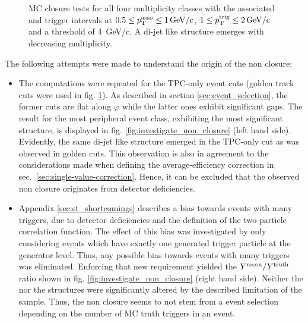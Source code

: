 \begin{figure}
\begin{subfigure}[b]{0.5\textwidth}
  \end{subfigure}
  \caption[MC closure tests for all four multiplicity classes.]{MC closure tests for all four multiplicity classes with the associated and trigger intervals at $0.5 \le p_{\text{T}}^{\text{asso}} \le \SI{1}{GeV/c}$, $1 \le p_{\text{T}}^{\text{trig}} \le \SI{2}{GeV/c}$ and a threshold of \SI{4}{GeV/c}. A di-jet like structure emerges with decreasing multiplicity.}
  \label{fig:closure_structure_w_threshold}
\end{figure}

The following attempts were made to understand the origin of the non closure:

\begin{itemize}
 \item The computations were repeated for the \gls{TPC-only} event cuts (\gls{golden} track cuts were used in fig. \ref{fig:closure_structure_w_threshold}). As described in section \ref{sec:event_selection}, the former cuts are flat along $\varphi$ while the latter ones exhibit significant gaps. The result for the most peripheral event class, exhibiting the most significant structure, is displayed in fig. \ref{fig:investigate_non_closure} (left hand side). Evidently, the same \gls{di-jet} like structure emerged in the \gls{TPC-only} cut as was observed in \gls{golden} cuts. This observation is also in agreement to the considerations made when defining the average-efficiency correction in sec.~\ref{sec:single-value-correction}. Hence, it can be excluded that the observed non closure originates from detector deficiencies.
 \item Appendix \ref{sec:st_shortcomings} describes a bias towards events with many triggers, due to detector deficiencies and the definition of the two-particle correlation function. The effect of this bias was investigated by only considering events which have exactly one generated trigger particle at the generator level. Thus, any possible bias towards events with many triggers was eliminated. Enforcing that new requirement yielded the $Y^{\text{recon}} / Y^{\text{truth}}$ ratio shown in fig. \ref{fig:investigate_non_closure} (right hand side). Neither the \deta nor the \dphi structures were significantly altered by the described limitation of the sample. Thus, the non closure seems to not stem from a event selection depending on the number of MC truth triggers in an event. 
\end{itemize}


